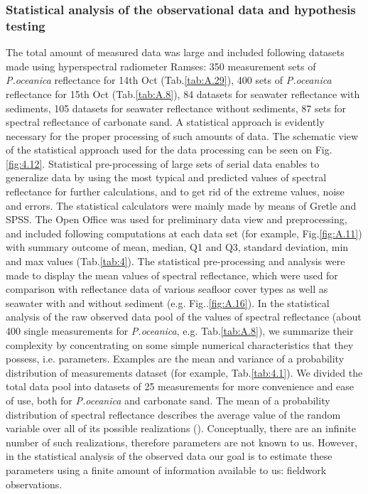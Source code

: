 \documentclass[10pt, a4paper]{article}
\begin{document}
\subsubsection{Statistical analysis of the observational data and hypothesis testing}
The total amount of measured data was large and included following datasets made using
hyperspectral radiometer Ramses: 350 measurement sets of \textit{P.oceanica} reflectance for 14th Oct (Tab.\ref{tab:A.29}), 400
sets of \textit{P.oceanica} reflectance for 15th Oct (Tab.\ref{tab:A.8}), 84 datasets for seawater reflectance with sediments, 105
datasets for seawater reflectance without sediments, 87 sets for spectral reflectance of carbonate sand.
A statistical approach is evidently necessary for the proper processing of such amounts of data. 
The schematic view of the statistical approach used for the data processing  can be seen on Fig. \ref{fig:4.12}.
Statistical pre-processing of large sets of serial data enables to generalize data by using the most typical and predicted values of
spectral reflectance for further calculations, and to get rid of the extreme values, noise and errors.
The statistical calculators were mainly made by means of Gretle and SPSS. 
The Open Office was used for preliminary data view and preprocessing, and included following computations
at each data set (for example, Fig.\ref{fig:A.11}) with summary outcome of mean, median, Q1 and Q3, standard deviation, min and max values (Tab.\ref{tab:4}). 
The statistical pre-processing and analysis were made to display the mean values of spectral reflectance,
which were used for comparison with reflectance data of various seafloor cover types as well as
seawater with and without sediment (e.g. Fig..\ref{fig:A.16}).
In the statistical analysis of the raw observed data pool of the values of spectral reflectance (about 400 single measurements for \textit{P.oceanica}, e.g. Tab.\ref{tab:A.8}), we summarize their complexity by concentrating on some simple numerical characteristics that they possess, i.e. parameters. Examples are the mean and variance of a probability distribution of measurements dataset (for example, Tab.\ref{tab:4.1}). We divided the total data pool into datasets of 25 measurements for more convenience and ease of use, both for \textit{P.oceanica} and carbonate sand. The mean of a probability distribution of spectral reflectance describes the average value of the random variable over all of its possible realizations (). Conceptually, there are an infinite number of such realizations, therefore parameters are not known to us. However, in the statistical analysis of the observed data our goal is to estimate these parameters using a finite amount of information available to us: fieldwork observations. \\
\end{document}
